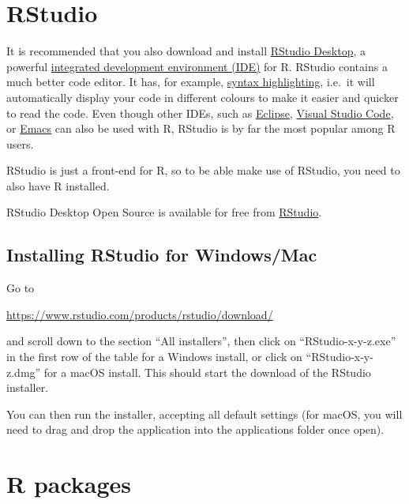 \documentclass[
]{book}
\begin{document}
\hypertarget{rstudio}{%
\section{RStudio}\label{rstudio}}

It is recommended that you also download and install \href{https://www.rstudio.com/products/rstudio/download/}{RStudio Desktop}, a powerful \href{https://en.wikipedia.org/wiki/Integrated_development_environment}{integrated development environment (IDE)} for R. RStudio contains a much better code editor. It has, for example, \href{https://en.wikipedia.org/wiki/Syntax_highlighting}{syntax highlighting}, i.e.~it will automatically display your code in different colours to make it easier and quicker to read the code. Even though other IDEs, such as \href{http://www.walware.de/goto/statet}{Eclipse}, \href{https://code.visualstudio.com/}{Visual Studio Code}, or \href{https://ess.r-project.org/}{Emacs} can also be used with R, RStudio is by far the most popular among R users.

RStudio is just a front-end for R, so to be able make use of RStudio, you need to also have R installed.

RStudio Desktop Open Source is available for free from \href{https://rstudio.com}{RStudio}.

\hypertarget{installing-rstudio-for-windowsmac}{%
\subsection{Installing RStudio for Windows/Mac}\label{installing-rstudio-for-windowsmac}}

Go to

\url{https://www.rstudio.com/products/rstudio/download/}

and scroll down to the section ``All installers'', then click on ``RStudio-x-y-z.exe'' in the first row of the table for a Windows install, or click on ``RStudio-x-y-z.dmg'' for a macOS install. This should start the download of the RStudio installer.

You can then run the installer, accepting all default settings (for macOS, you will need to drag and drop the application into the applications folder once open).

\hypertarget{r-packages}{%
\section{R packages}\label{r-packages}}
\end{document}
